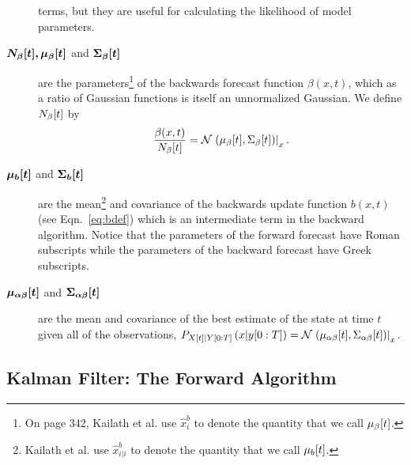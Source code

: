 \begin{description}
  terms, but they are useful for calculating the likelihood of model
  parameters.
\item[$\bm{{N_\beta}{[t]},{\mu_\beta}{[t]}}$ and
  $\bm{{\Sigma_\beta}{[t]}}$] are the parameters\footnote{On page
    342, Kailath et al.\cite{KSH00} use $\hat x_i^b$ to denote the
    quantity that we call ${\mu_\beta}{[t]}$.} of the
  backwards forecast function $\beta(x,t)$, which as a ratio of
  Gaussian functions is itself an unnormalized Gaussian.  We define
  ${N_\beta}{[t]}$ by
  \begin{equation*}
    \frac{\beta(x,t)}{{N_\beta}{[t]}} =
    {\mathcal{N}}\left.\left({\mu_\beta}{[t]},{\Sigma_\beta}{[t]}\right)\right|_{x}.
  \end{equation*}
\item[$\bm{{\mu_b}{[t]}}$ and $\bm{{\Sigma_b}{[t]}}$] are the
  mean\footnote{Kailath et al.\cite{KSH00} use $\hat x_{i|i}^b$ to
    denote the quantity that we call ${\mu_b}{[t]}$.} and covariance
  of the backwards update function $b(x,t)$ (see Eqn.~\eqref{eq:bdef})
  which is an intermediate term in the backward algorithm.  Notice
  that the parameters of the forward forecast have Roman subscripts
  while the parameters of the backward forecast have Greek subscripts.
\item[$\bm{{\mu_{\alpha\beta}}{[t]}}$ and
  $\bm{{\Sigma_{\alpha\beta}}{[t]}}$] are the mean and covariance
  of the best estimate of the state at time $t$ given all of the
  observations, \ie $P_{{X}{[t]}|Y[0:T]} \left(x|y[0:T]
  \right) =
  {\mathcal{N}}\left.\left({\mu_{\alpha\beta}}{[t]},{\Sigma_{\alpha\beta}}{[t]}\right)\right|_{x}$.
\end{description}


\subsection{Kalman Filter: The Forward Algorithm}

